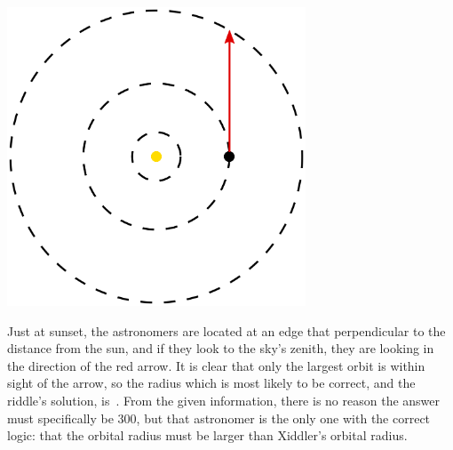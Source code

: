 \documentclass{article}
\begin{document}
\begin{center}
\includegraphics[width=3.5in]{solar_system.png}
\end{center}

Just at sunset, the astronomers are located at an edge that perpendicular to the distance from the sun, and if they look to the sky's zenith, they are looking in the direction of the red arrow.
It is clear that only the largest orbit is within sight of the arrow, so the radius which is most likely to be correct, and the riddle's solution, is
\,.
From the given information, there is no reason the answer must specifically be 300, but that astronomer is the only one with the correct logic: that the orbital radius must be larger than Xiddler's orbital radius.
\end{document}
